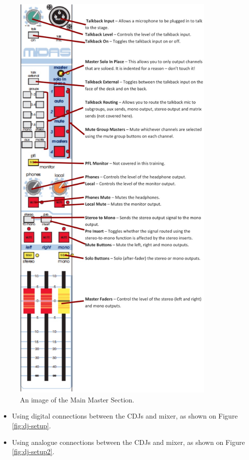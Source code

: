 \documentclass[14pt,twocolumn]{extarticle} %
\begin{document}
\begin{figure}[H]
\begin{center}

\includegraphics[width=10cm]{master-section.jpg}
\caption{An image of the Main Master Section.}
\label{fig:master-section}

\end{center}
\end{figure}

\vspace{5mm}

\begin{itemize}

\item Using digital connections between the CDJs and mixer, as shown on Figure \ref{fig:dj-setup}.

\item Using analogue connections between the CDJs and mixer, as shown on Figure \ref{fig:dj-setup2}.

\end{itemize}
\end{document}
